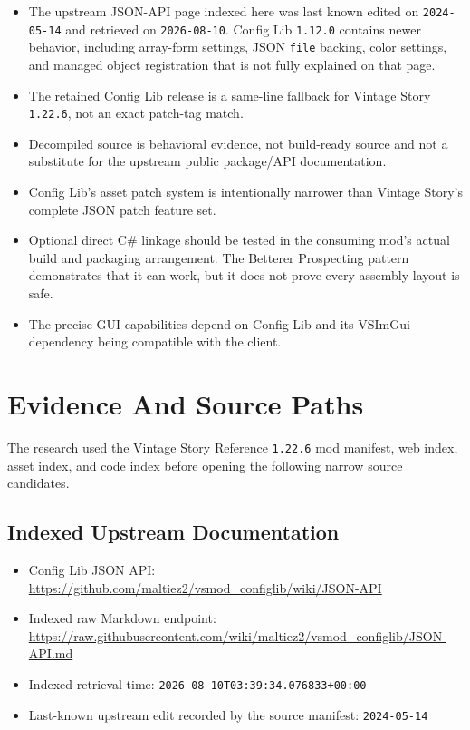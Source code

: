 \documentclass[
  11pt,
  letterpaper,
  titlepage]{article}
\providecommand{\tightlist}{%
  \setlength{\itemsep}{0pt}\setlength{\parskip}{0pt}}
\begin{document}
\begin{itemize}
\tightlist
\item
  The upstream JSON-API page indexed here was last known edited on
  \texttt{2024-05-14} and retrieved on \texttt{2026-08-10}. Config Lib
  \texttt{1.12.0} contains newer behavior, including array-form
  settings, JSON \texttt{file} backing, color settings, and managed
  object registration that is not fully explained on that page.
\item
  The retained Config Lib release is a same-line fallback for Vintage
  Story \texttt{1.22.6}, not an exact patch-tag match.
\item
  Decompiled source is behavioral evidence, not build-ready source and
  not a substitute for the upstream public package/API documentation.
\item
  Config Lib's asset patch system is intentionally narrower than Vintage
  Story's complete JSON patch feature set.
\item
  Optional direct C\# linkage should be tested in the consuming mod's
  actual build and packaging arrangement. The Betterer Prospecting
  pattern demonstrates that it can work, but it does not prove every
  assembly layout is safe.
\item
  The precise GUI capabilities depend on Config Lib and its VSImGui
  dependency being compatible with the client.
\end{itemize}

\section{Evidence And Source Paths}\label{evidence-and-source-paths}

The research used the Vintage Story Reference \texttt{1.22.6} mod
manifest, web index, asset index, and code index before opening the
following narrow source candidates.

\subsection{Indexed Upstream
Documentation}\label{indexed-upstream-documentation}

\begin{itemize}
\tightlist
\item
  Config Lib JSON API:
  \url{https://github.com/maltiez2/vsmod_configlib/wiki/JSON-API}
\item
  Indexed raw Markdown endpoint:
  \url{https://raw.githubusercontent.com/wiki/maltiez2/vsmod_configlib/JSON-API.md}
\item
  Indexed retrieval time: \texttt{2026-08-10T03:39:34.076833+00:00}
\item
  Last-known upstream edit recorded by the source manifest:
  \texttt{2024-05-14}
\end{itemize}
\end{document}
